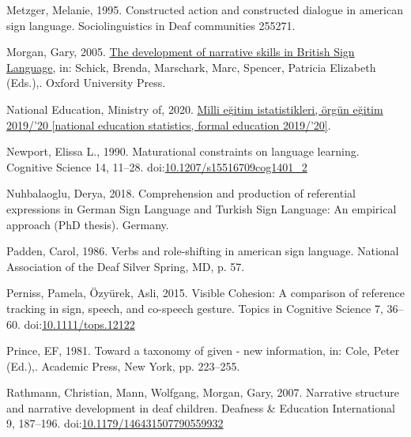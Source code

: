 \documentclass[]{elsarticle} %
\newlength{\cslhangindent}
\newenvironment{CSLReferences}[2] %
 {%
  \setlength{\parindent}{0pt}
  \ifodd #1 \everypar{\setlength{\hangindent}{\cslhangindent}}\ignorespaces\fi
  \ifnum #2 > 0
  \setlength{\parskip}{#2\baselineskip}
  \fi
 }%
 {}
\begin{document}
\begin{CSLReferences}{1}{0}
\leavevmode{}%
Metzger, Melanie, 1995. Constructed action and constructed dialogue in
american sign language. Sociolinguistics in Deaf communities 255271.

\leavevmode{}%
Morgan, Gary, 2005.
\href{http://www.oxfordscholarship.com/view/10.1093/acprof:oso/9780195180947.001.0001/acprof-9780195180947}{The
development of narrative skills in British Sign Language}, in: Schick,
Brenda, Marschark, Marc, Spencer, Patricia Elizabeth (Eds.),. Oxford
University Press.

\leavevmode{}%
National Education, Ministry of, 2020.
\href{http://sgb.meb.gov.tr/meb_iys_dosyalar/2020_09/04144812_meb_istatistikleri_orgun_\%20egitim_2019_2020.pdf}{Milli
e{ğ}itim istatistikleri, örgün e{ğ}itim 2019/{'}20 {[}national education
statistics, formal education 2019/{'}20{]}}.

\leavevmode{}%
Newport, Elissa L., 1990. Maturational constraints on language learning.
Cognitive Science 14, 11--28.
doi:\href{https://doi.org/10.1207/s15516709cog1401_2}{10.1207/s15516709cog1401\_2}

\leavevmode{}%
Nuhbalaoglu, Derya, 2018. Comprehension and production of referential
expressions in German Sign Language and Turkish Sign Language: An
empirical approach (PhD thesis). Germany.

\leavevmode{}%
Padden, Carol, 1986. Verbs and role-shifting in american sign language.
National Association of the Deaf Silver Spring, MD, p. 57.

\leavevmode{}%
Perniss, Pamela, Özyürek, Asli, 2015. Visible Cohesion: A comparison of
reference tracking in sign, speech, and co-speech gesture. Topics in
Cognitive Science 7, 36--60.
doi:\href{https://doi.org/10.1111/tops.12122}{10.1111/tops.12122}

\leavevmode{}%
Prince, EF, 1981. Toward a taxonomy of given - new information, in:
Cole, Peter (Ed.),. Academic Press, New York, pp. 223--255.

\leavevmode{}%
Rathmann, Christian, Mann, Wolfgang, Morgan, Gary, 2007. Narrative
structure and narrative development in deaf children. Deafness \&
Education International 9, 187--196.
doi:\href{https://doi.org/10.1179/146431507790559932}{10.1179/146431507790559932}


\end{CSLReferences}
\end{document}
